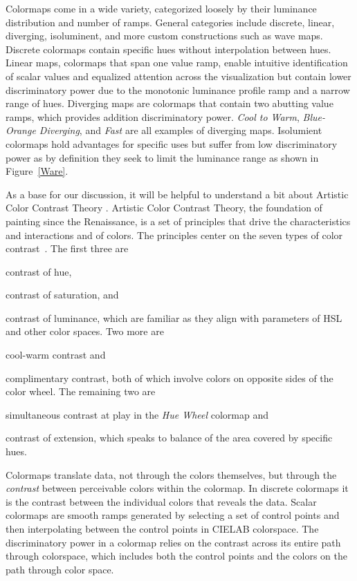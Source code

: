 \documentclass{IEEEcsmag}
\newcommand*{\colormap}[1]{\textsl{#1}\xspace}
\newcommand*{\huewheel}{\colormap{Hue Wheel}}
\newcommand*{\coolwarm}{\colormap{Cool to Warm}}
\newcommand*{\blueorange}{\colormap{Blue-Orange Diverging}}
\newcommand*{\fast}{\colormap{Fast}}
\begin{document}
Colormaps come in a wide variety, categorized loosely by their luminance distribution and number of ramps.
General categories include discrete, linear, diverging, isoluminent, and more custom constructions such as wave maps.
Discrete colormaps contain specific hues without interpolation between hues.
Linear maps, colormaps that span one value ramp, enable intuitive identification of scalar values and equalized attention across the visualization but contain lower discriminatory power due to the monotonic luminance profile ramp and a narrow range of hues.
Diverging maps are colormaps that contain two abutting value ramps, which provides addition discriminatory power.
\coolwarm, \blueorange, and \fast are all examples of diverging maps.
Isolumient colormaps hold advantages for specific uses but suffer from low discriminatory power as by definition they seek to limit the luminance range as shown in Figure~\ref{Ware}.

As a base for our discussion, it will be helpful to understand a bit about Artistic Color Contrast Theory \cite{Itten, Albers}. Artistic Color Contrast Theory, the foundation of painting since the Renaissance, is a set of principles that drive the characteristics and interactions and of colors. The principles center on the seven types of color contrast~\cite{Itten}.
The first three are
\begin{inparaenum}[(1)]
\item contrast of hue,
\item contrast of saturation, and
\item contrast of luminance, which are familiar as they align with parameters of HSL and other color spaces.
Two more are
\item cool-warm contrast and
\item complimentary contrast, both of which involve colors on opposite sides of the color wheel.
The remaining two are
\item simultaneous contrast at play in the \huewheel colormap and
\item contrast of extension, which speaks to balance of the area covered by specific hues.
\end{inparaenum}

Colormaps translate data, not through the colors themselves, but through the \textit{contrast} between perceivable colors within the colormap. In discrete colormaps it is the contrast between the individual colors that reveals the data. Scalar colormaps are smooth ramps generated by selecting a set of control points and then interpolating between the control points in CIELAB colorspace. The discriminatory power in a colormap relies on the contrast across its entire path through colorspace, which includes both the control points and the colors on the path through color space.
\end{document}
